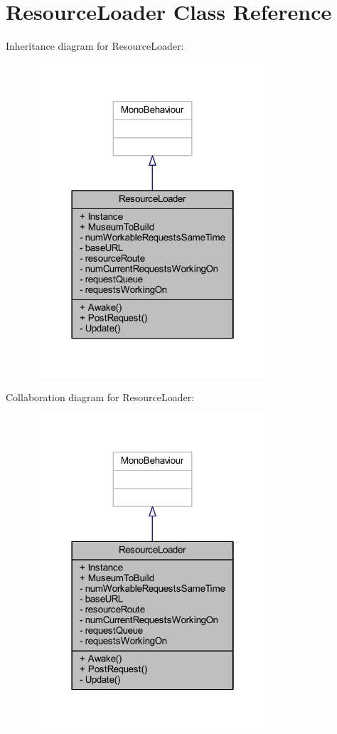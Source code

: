 \hypertarget{class_resource_loader}{}\section{Resource\+Loader Class Reference}
\label{class_resource_loader}


Inheritance diagram for Resource\+Loader\+:
\nopagebreak
\begin{figure}[H]
\begin{center}
\leavevmode
\includegraphics[width=250pt]{class_resource_loader__inherit__graph}
\end{center}
\end{figure}


Collaboration diagram for Resource\+Loader\+:
\nopagebreak
\begin{figure}[H]
\begin{center}
\leavevmode
\includegraphics[width=250pt]{class_resource_loader__coll__graph}
\end{center}
\end{figure}
